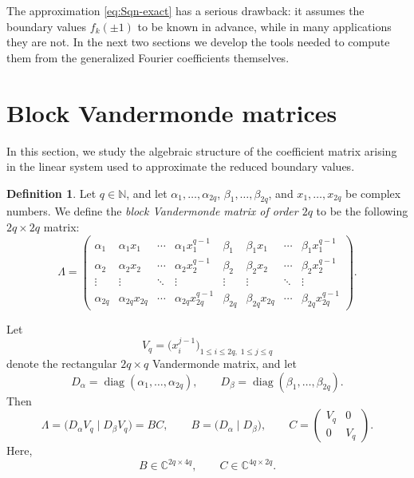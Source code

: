 \documentclass[11pt,a4paper]{article}
\theoremstyle{definition}
\newtheorem{definition}[theorem]{Definition}
\begin{document}
The approximation \eqref{eq:Sqn-exact} has a serious drawback: it assumes the boundary values $f_k(\pm1)$ to be known in advance, while in many applications they are not. In the next two sections we develop the tools needed to compute them from the generalized Fourier coefficients themselves.

\section{Block Vandermonde matrices}\label{sec:vand}

In this section, we study the algebraic structure of the coefficient
matrix arising in the linear system used to approximate the reduced
boundary values.

\begin{definition}
Let $q\in\mathbb N$, and let
$\alpha_1,\dots,\alpha_{2q}$, $\beta_1,\dots,\beta_{2q}$, and
$x_1,\dots,x_{2q}$ be complex numbers. We define the
\emph{block Vandermonde matrix of order $2q$} to be the following
$2q\times 2q$ matrix:
\begin{equation}\label{eq:bv}
\Lambda
=
\begin{pmatrix}
\alpha_1 & \alpha_1x_1 & \cdots & \alpha_1x_1^{q-1}
&
\beta_1 & \beta_1x_1 & \cdots & \beta_1x_1^{q-1}
\\
\alpha_2 & \alpha_2x_2 & \cdots & \alpha_2x_2^{q-1}
&
\beta_2 & \beta_2x_2 & \cdots & \beta_2x_2^{q-1}
\\
\vdots & \vdots & \ddots & \vdots
&
\vdots & \vdots & \ddots & \vdots
\\
\alpha_{2q} & \alpha_{2q}x_{2q} & \cdots
& \alpha_{2q}x_{2q}^{q-1}
&
\beta_{2q} & \beta_{2q}x_{2q} & \cdots
& \beta_{2q}x_{2q}^{q-1}
\end{pmatrix}.
\end{equation}
\end{definition}

Let
\[
V_q
=
\bigl(x_i^{j-1}\bigr)_
{1\le i\le 2q,\;1\le j\le q}
\]
denote the rectangular $2q\times q$ Vandermonde matrix, and let
\[
D_\alpha
=
\operatorname{diag}(\alpha_1,\dots,\alpha_{2q}),
\qquad
D_\beta
=
\operatorname{diag}(\beta_1,\dots,\beta_{2q}).
\]
Then
\begin{equation}\label{eq:bv-factor}
\Lambda
=
\bigl(D_\alpha V_q\mid D_\beta V_q\bigr)
=
BC,
\qquad
B
=
\bigl(D_\alpha\mid D_\beta\bigr),
\qquad
C
=
\begin{pmatrix}
V_q & 0\\
0 & V_q
\end{pmatrix}.
\end{equation}
Here,
\[
B\in\mathbb C^{2q\times 4q},
\qquad
C\in\mathbb C^{4q\times 2q}.
\]
\end{document}
